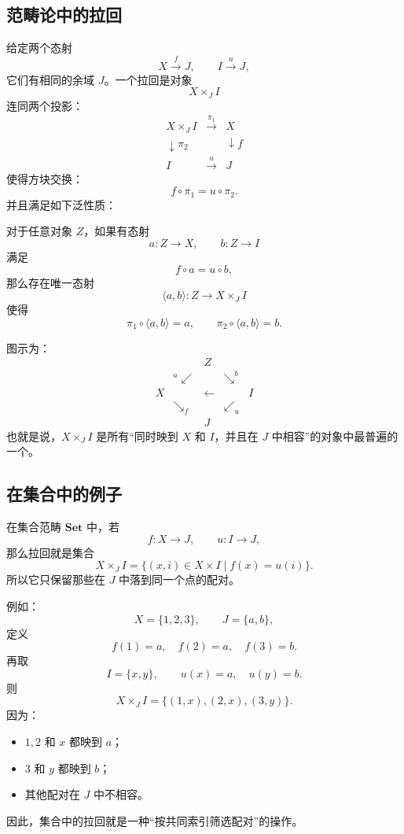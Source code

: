 \documentclass[12pt,a4paper]{article}
\begin{document}
\subsection{范畴论中的拉回}

给定两个态射
\[
X\xrightarrow{f}J,
\qquad
I\xrightarrow{u}J,
\]
它们有相同的余域 \(J\)。一个拉回是对象
\[
X\times_J I
\]
连同两个投影：
\[
\begin{array}{ccc}
X\times_J I & \xrightarrow{\pi_1} & X\\
\downarrow{\pi_2} && \downarrow f\\
I & \xrightarrow{u} & J
\end{array}
\]
使得方块交换：
\[
f\circ\pi_1=u\circ\pi_2.
\]
并且满足如下泛性质：

对于任意对象 \(Z\)，如果有态射
\[
a:Z\to X,
\qquad
b:Z\to I
\]
满足
\[
f\circ a=u\circ b,
\]
那么存在唯一态射
\[
\langle a,b\rangle:Z\to X\times_J I
\]
使得
\[
\pi_1\circ\langle a,b\rangle=a,
\qquad
\pi_2\circ\langle a,b\rangle=b.
\]

图示为：
\[
\begin{array}{ccccc}
&&Z&&\\
&{}^{a}\swarrow&&\searrow^{b}&\\
X&&\longleftarrow&&I\\
&\searrow_f&&\swarrow_u&\\
&&J&
\end{array}
\]
也就是说，\(X\times_J I\) 是所有“同时映到 \(X\) 和 \(I\)，并且在 \(J\) 中相容”的对象中最普遍的一个。

\subsection{在集合中的例子}

在集合范畴 \(\mathbf{Set}\) 中，若
\[
f:X\to J,
\qquad
u:I\to J,
\]
那么拉回就是集合
\[
X\times_J I
=
\{(x,i)\in X\times I\mid f(x)=u(i)\}.
\]
所以它只保留那些在 \(J\) 中落到同一个点的配对。

例如：
\[
X=\{1,2,3\},\qquad
J=\{a,b\},
\]
定义
\[
f(1)=a,\quad f(2)=a,\quad f(3)=b.
\]
再取
\[
I=\{x,y\},
\qquad
u(x)=a,\quad u(y)=b.
\]
则
\[
X\times_J I
=
\{(1,x),(2,x),(3,y)\}.
\]
因为：
\begin{itemize}
  \item \(1,2\) 和 \(x\) 都映到 \(a\)；
  \item \(3\) 和 \(y\) 都映到 \(b\)；
  \item 其他配对在 \(J\) 中不相容。
\end{itemize}
因此，集合中的拉回就是一种“按共同索引筛选配对”的操作。
\end{document}
